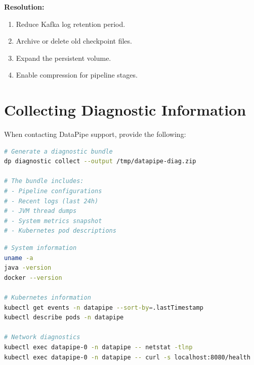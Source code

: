 \documentclass[
    language=english,
    doctype=manual,
    institution=none,
    titlestyle=book,
    oneside,
]{../../omnilatex}
\begin{document}
\textbf{Resolution:}

\begin{enumerate}
    \item Reduce Kafka log retention period.
    \item Archive or delete old checkpoint files.
    \item Expand the persistent volume.
    \item Enable compression for pipeline stages.
\end{enumerate}

\chapter{Collecting Diagnostic Information}
\label{sec:diagnostics}

When contacting DataPipe support, provide the following:

\begin{lstlisting}[language=bash, caption={Generate diagnostic bundle.}]
# Generate a diagnostic bundle
dp diagnostic collect --output /tmp/datapipe-diag.zip

# The bundle includes:
# - Pipeline configurations
# - Recent logs (last 24h)
# - JVM thread dumps
# - System metrics snapshot
# - Kubernetes pod descriptions
\end{lstlisting}

\begin{lstlisting}[language=bash, caption={Useful diagnostic commands.}]
# System information
uname -a
java -version
docker --version

# Kubernetes information
kubectl get events -n datapipe --sort-by=.lastTimestamp
kubectl describe pods -n datapipe

# Network diagnostics
kubectl exec datapipe-0 -n datapipe -- netstat -tlnp
kubectl exec datapipe-0 -n datapipe -- curl -s localhost:8080/health
\end{lstlisting}

\printbibliography[heading=bibintoc, title={References}]
\end{document}
